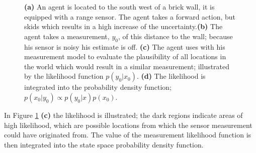 \begin{figure}
  \centering
 \caption{\textbf{(a)} An agent is located to the south west of a brick wall, it is equipped with a 
  range sensor. The agent takes a forward action, but skids which results in a high increase of the uncertainty.\textbf{(b)} 
  The agent takes a measurement, $y_0$, of this distance to the wall; because his sensor is noisy his estimate is off. 
  \textbf{(c)} The agent uses with his measurement model to evaluate the plausibility of all locations in the world which would result in a similar
  measurement; illustrated by the likelihood function $p(y_0|x_0)$. \textbf{(d)} The likelihood is integrated into the probability 
  density function; $p(x_0|y_0) \propto p(y_0|x)p(x_0)$.}
  \label{fig:belief_update_example}
\end{figure}

In Figure \ref{fig:belief_update_example} \textbf{(c)} the likelihood is illustrated; the dark regions indicate areas of high 
likelihood, which are possible locations from which the sensor measurement could have originated from. The value of the measurement
likelihood function is then integrated into the state space probability density function.

